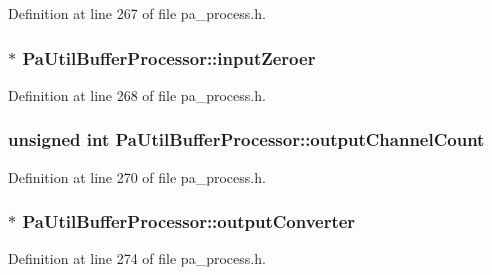 Definition at line 267 of file pa\+\_\+process.\+h.

\subsubsection[{\texorpdfstring{input\+Zeroer}{inputZeroer}}]{$\ast$ Pa\+Util\+Buffer\+Processor\+::input\+Zeroer}\hypertarget{struct_pa_util_buffer_processor_a032b5f8772cc7fe2ec6a43219afdf367}{}\label{struct_pa_util_buffer_processor_a032b5f8772cc7fe2ec6a43219afdf367}


Definition at line 268 of file pa\+\_\+process.\+h.

\subsubsection[{\texorpdfstring{output\+Channel\+Count}{outputChannelCount}}]{\setlength{\rightskip}{0pt plus 5cm}unsigned {\bf int} Pa\+Util\+Buffer\+Processor\+::output\+Channel\+Count}\hypertarget{struct_pa_util_buffer_processor_af2c3ba9b0cc5bd8eb2fad8b73b40ad18}{}\label{struct_pa_util_buffer_processor_af2c3ba9b0cc5bd8eb2fad8b73b40ad18}


Definition at line 270 of file pa\+\_\+process.\+h.

\subsubsection[{\texorpdfstring{output\+Converter}{outputConverter}}]{$\ast$ Pa\+Util\+Buffer\+Processor\+::output\+Converter}\hypertarget{struct_pa_util_buffer_processor_ac6a539ab66c9a4a71d8603e7ed7394ad}{}\label{struct_pa_util_buffer_processor_ac6a539ab66c9a4a71d8603e7ed7394ad}


Definition at line 274 of file pa\+\_\+process.\+h.

